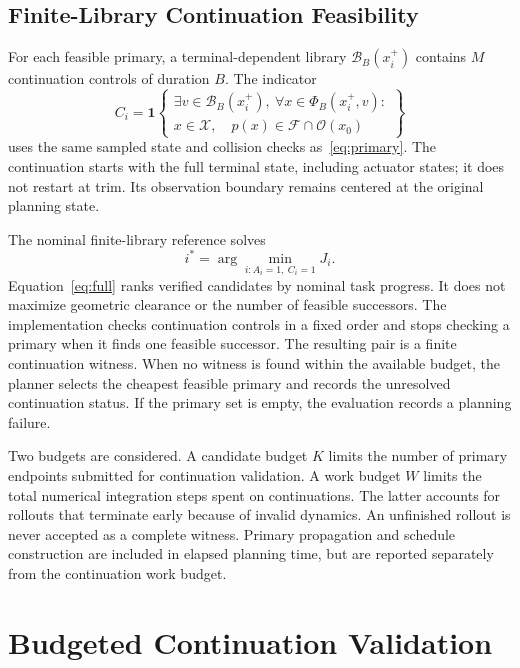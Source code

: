 \documentclass[journal]{IEEEtran}
\begin{document}
\subsection{Finite-Library Continuation Feasibility}
For each feasible primary, a terminal-dependent library $\mathcal B_B(x_i^+)$ contains $M$ continuation controls of duration $B$. The indicator
\begin{equation}
 C_i=\mathbf 1\left\{\begin{array}{l}\exists v\in\mathcal B_B(x_i^+),\ \forall x\in\Phi_B(x_i^+,v):\\
 x\in\mathcal X,\quad p(x)\in\mathcal F\cap\mathcal O(x_0)\end{array}\right\}
 \label{eq:continuation}
\end{equation}
uses the same sampled state and collision checks as~\eqref{eq:primary}. The continuation starts with the full terminal state, including actuator states; it does not restart at trim. Its observation boundary remains centered at the original planning state.

The nominal finite-library reference solves
\begin{equation}
 i^*=\arg\min_{i:A_i=1,\ C_i=1}J_i. \label{eq:full}
\end{equation}
Equation~\eqref{eq:full} ranks verified candidates by nominal task progress. It does not maximize geometric clearance or the number of feasible successors. The implementation checks continuation controls in a fixed order and stops checking a primary when it finds one feasible successor. The resulting pair is a finite continuation witness. When no witness is found within the available budget, the planner selects the cheapest feasible primary and records the unresolved continuation status. If the primary set is empty, the evaluation records a planning failure.

Two budgets are considered. A candidate budget $K$ limits the number of primary endpoints submitted for continuation validation. A work budget $W$ limits the total numerical integration steps spent on continuations. The latter accounts for rollouts that terminate early because of invalid dynamics. An unfinished rollout is never accepted as a complete witness. Primary propagation and schedule construction are included in elapsed planning time, but are reported separately from the continuation work budget.

\section{Budgeted Continuation Validation}
\end{document}
